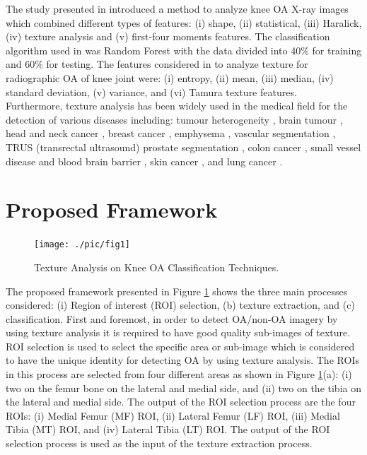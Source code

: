 \documentclass[review]{elsarticle}
\begin{document}
The study presented in \cite{S.2016} introduced a method to analyze knee OA X-ray images which combined different types of features: (i) shape, (ii) statistical, (iii) Haralick, (iv) texture analysis and (v) first-four moments features. The classification algorithm used in \cite{S.2016} was Random Forest with the data divided into 40\% for training and 60\% for testing. The features considered in \cite{Kawathekar2015} to analyze texture for radiographic OA of knee joint were: (i) entropy, (ii) mean, (iii) median, (iv) standard deviation, (v) variance, and (vi) Tamura texture features. \\

Furthermore, texture analysis has been widely used in the medical field for the detection of various diseases including: tumour heterogeneity \cite{Liu2017, Miles2013}, brain tumour \cite{Weltens2001}, head and neck cancer \cite{Yu2009}, breast cancer \cite{Zhou2007}, emphysema \cite{Xu2006,Vasconcelos}, vascular segmentation \cite{PoddaB.2005, Ahmed2013}, TRUS (transrectal ultrasound) prostate segmentation \cite{Yuan2013, Kachouie2007}, colon cancer \cite{Esgiar2002}, small vessel disease and blood brain barrier \cite{ValdesHernandez2017}, skin cancer \cite{Ntroduction2014}, and lung cancer \cite{Pham2017}.

\section{Proposed Framework}

\begin{figure}[h!]
	\centering
	\texttt{[image: ./pic/fig1]}
	\caption{Texture Analysis on Knee OA Classification Techniques.}
	\label{fig:framework}
\end{figure}

The proposed framework presented in Figure \ref{fig:framework} shows the three main processes considered: (i) Region of interest (ROI) selection, (b) texture extraction, and (c) classification. First and foremost, in order to detect OA/non-OA imagery by using texture analysis it is required to have good quality sub-images of texture. ROI selection is used to select the specific area or sub-image which is considered to have the unique identity for detecting OA by using texture analysis. The ROIs in this process are selected from four different areas as shown in Figure \ref{fig:framework}(a): (i) two on the femur bone on the lateral and medial side, and (ii) two on the tibia on the lateral and medial side. The output of the ROI selection process are the four ROIs: (i) Medial Femur (MF) ROI, (ii) Lateral Femur (LF) ROI, (iii) Medial Tibia (MT) ROI, and (iv) Lateral Tibia (LT) ROI. The output of the ROI selection process is used as the input of the texture extraction process. \\
\end{document}
